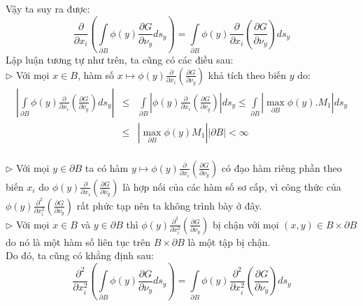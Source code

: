 Vậy ta suy ra được:
\[
\frac{\partial }
{{\partial x_i }}\left( {\int\limits_{\partial B} {\phi \left( y \right)\frac{{\partial G}}
{{\partial \nu _y }}ds_y } } \right) = \int\limits_{\partial B} {\phi \left( y \right)\frac{\partial }
{{\partial x_i }}\left( {\frac{{\partial G}}
{{\partial \nu _y }}} \right)ds_y } 
\]
Lập luận tương tự như trên, ta cũng có các điều sau:\\
$\triangleright$ Với mọi $
x \in B
$, hàm số $
x \mapsto \phi \left( y \right)\frac{\partial }
{{\partial x_i }}\left( {\frac{{\partial G}}
{{\partial \nu _y }}} \right)
$ khả tích theo biến $y$ do:
\begin{eqnarray}
\left| {\int\limits_{\partial B} {\phi \left( y \right)\frac{\partial }
{{\partial x_i }}\left( {\frac{{\partial G}}
{{\partial \nu _y }}} \right)ds_y } } \right| &\leqslant & \int\limits_{\partial B} {\left| {\phi \left( y \right)\frac{\partial }
{{\partial x_i }}\left( {\frac{{\partial G}}
{{\partial \nu _y }}} \right)} \right|ds_y }  \leqslant \int\limits_{\partial B} {\left| {\mathop {\max }\limits_{\partial B} \phi \left( y \right).M_1 } \right|ds_y } \nonumber\\
& \leqslant &\left| {\mathop {\max }\limits_{\partial B} \phi \left( y \right)M_1 } \right|\left| {\partial B} \right| < \infty \nonumber
\end{eqnarray}
\\$\triangleright$ Với mọi $
y \in \partial B
$ ta có hàm $
y \mapsto \phi \left( y \right)\frac{\partial }
{{\partial x_i }}\left( {\frac{{\partial G}}
{{\partial \nu _y }}} \right)
$ có đạo hàm riêng phần theo biến $x_i$ do $
\phi \left( y \right)\frac{\partial }
{{\partial x_i }}\left( {\frac{{\partial G}}
{{\partial \nu _y }}} \right)
$ là hợp nối của các hàm số sơ cấp, vì công thức của $
\phi \left( y \right)\frac{{\partial ^2 }}
{{\partial x_i^2 }}\left( {\frac{{\partial G}}
{{\partial \nu _y }}} \right)
$ rất phức tạp nên ta không trình bày ở đây.\\
$\triangleright$ Với mọi $
x \in B
$ và $
y \in \partial B
$ thì $
\phi \left( y \right)\frac{{\partial ^2 }}
{{\partial x_i^2 }}\left( {\frac{{\partial G}}
{{\partial \nu _y }}} \right)
$ bị chận với mọi $
\left( {x,y} \right) \in B \times \partial B
$ do nó là một hàm số liên tục trên $
B \times \partial B
$ là một tập bị chận.\\
Do đó, ta cũng có khẳng định sau:
\[
\frac{{\partial ^2 }}
{{\partial x_i^2 }}\left( {\int\limits_{\partial B} {\phi \left( y \right)\frac{{\partial G}}
{{\partial \nu _y }}ds_y } } \right) = \int\limits_{\partial B} {\phi \left( y \right)\frac{{\partial ^2 }}
{{\partial x_i^2 }}\left( {\frac{{\partial G}}
{{\partial \nu _y }}} \right)ds_y } 
\]
